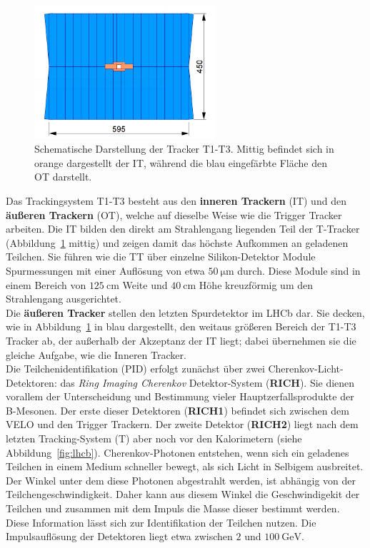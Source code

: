 %
\begin{figure}[h]
  \centering
      \includegraphics[width=0.6\textwidth]{Plots/tracker.png}
  \caption{Schematische Darstellung der Tracker T1-T3. Mittig befindet sich in orange dargestellt der IT, während die blau eingefärbte Fläche den OT darstellt\cite{tracker}.}
  \label{fig:tracker}
\end{figure}
%
Das Trackingsystem T1-T3 besteht aus den \textbf{inneren Trackern} (IT) und den \textbf{äußeren Trackern} (OT), welche auf dieselbe Weise wie die Trigger Tracker arbeiten\cite{tracker}. Die IT bilden den direkt am Strahlengang liegenden Teil der T-Tracker (Abbildung~\ref{fig:tracker} mittig) und zeigen damit das höchste Aufkommen an geladenen Teilchen. Sie führen wie die TT über einzelne Silikon-Detektor Module Spurmessungen mit einer Auflösung von etwa $\SI{50}{\micro\meter}$ durch. Diese Module sind in einem Bereich von $\SI{125}{\centi\meter}$ Weite und $\SI{40}{\centi\meter}$ Höhe kreuzförmig um den Strahlengang ausgerichtet\cite{tracker}.\\
Die \textbf{äußeren Tracker} stellen den letzten Spurdetektor im LHCb dar. Sie decken, wie in Abbildung~\ref{fig:tracker} in blau dargestellt, den weitaus größeren Bereich der T1-T3 Tracker ab, der außerhalb der Akzeptanz der IT liegt; dabei übernehmen sie die gleiche Aufgabe, wie die Inneren Tracker.\\
%
Die Teilchenidentifikation (PID) erfolgt zunächst über zwei Cherenkov-Licht-Detektoren: das \textit{Ring Imaging Cherenkov} Detektor-System (\textbf{RICH}). Sie dienen vorallem der Unterscheidung und Bestimmung vieler Hauptzerfallsprodukte der B-Mesonen\cite{lhcb}. Der erste dieser Detektoren (\textbf{RICH1}) befindet sich zwischen dem VELO und den Trigger Trackern. Der zweite Detektor (\textbf{RICH2}) liegt nach dem letzten Tracking-System (T) aber noch vor den Kalorimetern (siehe Abbildung~\ref{fig:lhcb}). Cherenkov-Photonen entstehen, wenn sich ein geladenes Teilchen in einem Medium schneller bewegt, als sich Licht in Selbigem ausbreitet. Der Winkel unter dem diese Photonen abgestrahlt werden, ist abhängig von der Teilchengeschwindigkeit. Daher kann aus diesem Winkel die Geschwindigekit der Teilchen und zusammen mit dem Impuls die Masse dieser bestimmt werden. Diese Information lässt sich zur Identifikation der Teilchen nutzen. Die Impulsauflösung der Detektoren liegt etwa zwischen $2$ und $\SI{100}{\giga\electronvolt}$\cite{lhcb}.\\
